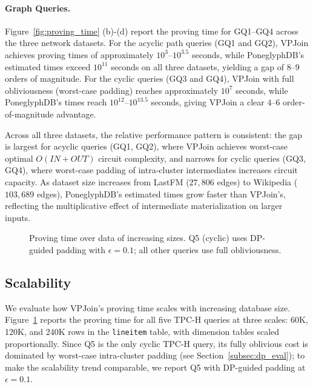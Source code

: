 \documentclass[sigconf]{acmart}
\begin{document}
\paragraph{Graph Queries.}
Figure~\ref{fig:proving_time} (b)-(d) report the proving time for GQ1--GQ4 across the three network datasets. For the acyclic path queries (GQ1 and GQ2), VPJoin achieves proving times of approximately $10^3$--$10^{3.5}$ seconds, while PoneglyphDB's estimated times exceed $10^{11}$ seconds on all three datasets, yielding a gap of $8$--$9$ orders of magnitude. For the cyclic queries (GQ3 and GQ4), VPJoin with full obliviousness (worst-case padding) reaches approximately $10^7$ seconds, while PoneglyphDB's times reach $10^{12}$--$10^{13.5}$ seconds, giving VPJoin a clear $4$--$6$ order-of-magnitude advantage. 


Across all three datasets, the relative performance pattern is consistent: the gap is largest for acyclic queries (GQ1, GQ2), where VPJoin achieves worst-case optimal $O(\mathit{IN}+\mathit{OUT})$ circuit complexity, and narrows for cyclic queries (GQ3, GQ4), where worst-case padding of intra-cluster intermediates increases circuit capacity. As dataset size increases from LastFM ($27{,}806$ edges) to Wikipedia ($103{,}689$ edges), PoneglyphDB's estimated times grow faster than VPJoin's, reflecting the multiplicative effect of intermediate materialization on larger inputs.






\begin{figure}
\centerline{ }
\captionsetup{skip=2pt}
\caption{Proving time over data of increasing sizes. Q5 (cyclic) uses DP-guided padding with $\epsilon=0.1$; all other queries use full obliviousness.}
\label{fig:scalability}
\vspace{-0.2in}
\end{figure}

\subsection{Scalability}
\label{subsec:scalability}
We evaluate how VPJoin's proving time scales with increasing database size. Figure~\ref{fig:scalability} reports the proving time for all five TPC-H queries at three scales: 60K, 120K, and 240K rows in the \texttt{lineitem} table, with dimension tables scaled proportionally. Since Q5 is the only cyclic TPC-H query, its fully oblivious cost is dominated by worst-case intra-cluster padding (see Section~\ref{subsec:dp_eval}); to make the scalability trend comparable, we report Q5 with DP-guided padding at $\epsilon=0.1$.
\end{document}
